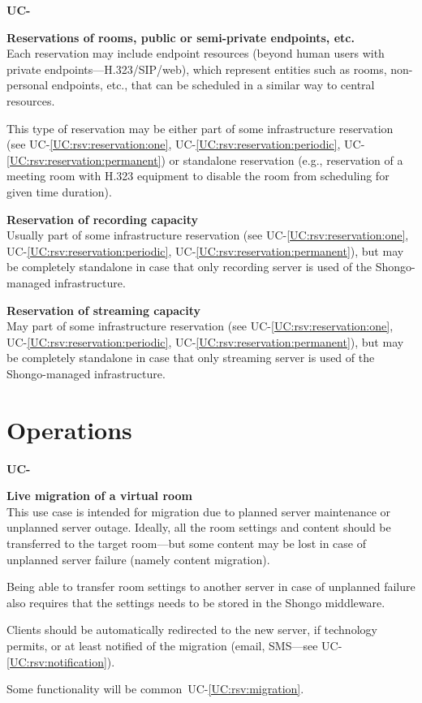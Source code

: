 \documentclass[a4paper]{report}
\makeatletter
\newcounter{UCcounter}
\newenvironment{UseCases}%
	{\begin{list}{\textbf{UC-\arabic{UCcounter}}}{\@nmbrlisttrue\def\@listctr{UCcounter}}}%
	{\end{list}}
\newcommand{\UClabel}[1]{\label{UC:#1}}
\newcommand{\UCref}[1]{UC-\ref{UC:#1}}
\newcommand{\UseCase}[2]{\item\UClabel{#2} \textbf{#1}\\}
\makeatother
\begin{document}
\begin{UseCases}
\UseCase{Reservations of rooms, public or semi-private endpoints,
etc.}{rsv:service-users}

Each reservation may include endpoint resources (beyond human users with
private endpoints---H.323/SIP/web), which represent entities such as rooms,
non-personal endpoints, etc., that can be scheduled in a similar way to central
resources.

This type of reservation may be either part of some infrastructure reservation
(see \UCref{rsv:reservation:one}, \UCref{rsv:reservation:periodic},
\UCref{rsv:reservation:permanent}) or standalone reservation (e.g., reservation
of a meeting room with H.323 equipment to disable the room from scheduling for
given time duration).


\UseCase{Reservation of recording capacity}{rsv:recording}

Usually part of some infrastructure reservation (see
\UCref{rsv:reservation:one}, \UCref{rsv:reservation:periodic},
\UCref{rsv:reservation:permanent}), but may be completely standalone in case
that only recording server is used of the Shongo-managed infrastructure.


\UseCase{Reservation of streaming capacity}{rsv:streaming}

May part of some infrastructure reservation (see \UCref{rsv:reservation:one},
\UCref{rsv:reservation:periodic}, \UCref{rsv:reservation:permanent}), but may
be completely standalone in case that only streaming server is used of the
Shongo-managed infrastructure.

\end{UseCases}


\section{Operations}

\begin{UseCases}

\UseCase{Live migration of a virtual room}{ops:migration}

This use case is intended for migration due to planned server maintenance or
unplanned server outage.  Ideally, all the room settings and content should be
transferred to the target room---but some content may be lost in case of
unplanned server failure (namely content migration).

Being able to transfer room settings to another server in case of unplanned
failure also requires that the settings needs to be stored in the Shongo
middleware.

Clients should be automatically redirected to the new server, if technology
permits, or at least notified of the migration (email, SMS---see
\UCref{rsv:notification}).

Some functionality will be common~\UCref{rsv:migration}.

\end{UseCases}
\end{document}
